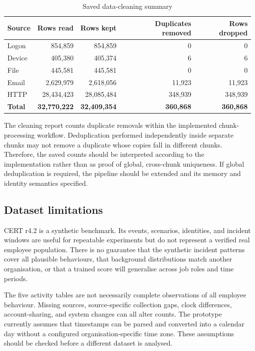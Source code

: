 \begin{table}[H]
\centering
\tablefont
\caption{Saved data-cleaning summary}
\label{tab:cleaning-summary}
\begin{tabularx}{\textwidth}{|p{}|R|R|R|R|}
\hline
\textbf{Source} & \textbf{Rows read} & \textbf{Rows kept} & \textbf{Duplicates removed} & \textbf{Rows dropped}\\\hline
Logon & 854,859 & 854,859 & 0 & 0\\\hline
Device & 405,380 & 405,374 & 6 & 6\\\hline
File & 445,581 & 445,581 & 0 & 0\\\hline
Email & 2,629,979 & 2,618,056 & 11,923 & 11,923\\\hline
HTTP & 28,434,423 & 28,085,484 & 348,939 & 348,939\\\hline
\textbf{Total} & \textbf{32,770,222} & \textbf{32,409,354} & \textbf{360,868} & \textbf{360,868}\\\hline
\end{tabularx}
\end{table}

The cleaning report counts duplicate removals within the implemented
chunk-processing workflow. Deduplication performed independently
inside separate chunks may not remove a duplicate whose copies fall in
different chunks. Therefore, the saved counts should be interpreted
according to the implementation rather than as proof of global,
cross-chunk uniqueness. If global deduplication is required, the
pipeline should be extended and its memory and identity semantics
specified.

\subsection{Dataset limitations}
CERT r4.2 is a synthetic benchmark. Its events, scenarios, identities,
and incident windows are useful for repeatable experiments but do not
represent a verified real employee population. There is no guarantee
that the synthetic incident patterns cover all plausible behaviours,
that background distributions match another organisation, or that a
trained score will generalise across job roles and time periods.

The five activity tables are not necessarily complete observations of
all employee behaviour. Missing sources, source-specific collection
gaps, clock differences, account-sharing, and system changes can all
alter counts. The prototype currently assumes that timestamps can be
parsed and converted into a calendar day without a configured
organisation-specific time zone. These assumptions should be checked
before a different dataset is analysed.

